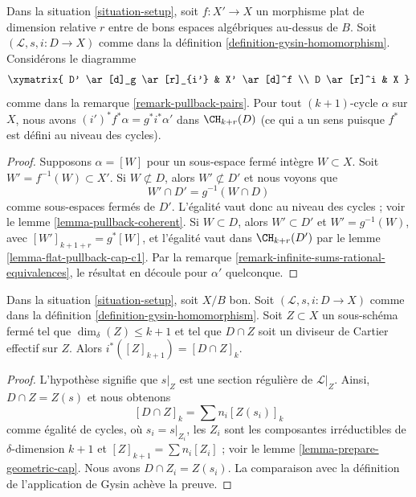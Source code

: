 \begin{lemma}
\label{lemma-gysin-flat-pullback}
Dans la situation \ref{situation-setup}, soit $f : X' \to X$ un morphisme plat
de dimension relative $r$ entre de bons espaces algébriques au-dessus de $B$. Soit
$(\mathcal{L}, s, i : D \to X)$ comme dans la définition
\ref{definition-gysin-homomorphism}. Considérons le diagramme
$$
\xymatrix{
D' \ar[d]_g \ar[r]_{i'} & X' \ar[d]^f \\
D \ar[r]^i & X
}
$$
comme dans la remarque \ref{remark-pullback-pairs}. Pour tout $(k + 1)$-cycle
$\alpha$ sur $X$, nous avons $(i')^*f^*\alpha = g^*i^*\alpha'$ dans $\CH_{k +
r}(D)$ (ce qui a un sens puisque $f^*$ est défini au niveau des cycles).
\end{lemma}

\begin{proof}
Supposons $\alpha = [W]$ pour un sous-espace fermé intègre $W \subset X$.
Soit $W' = f^{-1}(W) \subset X'$. Si $W \not \subset D$, alors $W'
\not \subset D'$ et nous voyons que
$$
W' \cap D' = g^{-1}(W \cap D)
$$
comme sous-espaces fermés de $D'$. L'égalité vaut donc au niveau des cycles ;
voir le lemme \ref{lemma-pullback-coherent}. Si $W
\subset D$, alors $W' \subset D'$ et $W' = g^{-1}(W)$, avec $[W']_{k + 1 + r} =
g^*[W]$, et l'égalité vaut dans $\CH_{k + r}(D')$ par le lemme
\ref{lemma-flat-pullback-cap-c1}. Par la remarque
\ref{remark-infinite-sums-rational-equivalences}, le résultat en découle pour
$\alpha'$ quelconque.
\end{proof}

\begin{lemma}
\label{lemma-easy-gysin}
Dans la situation \ref{situation-setup}, soit $X/B$ bon. Soit
$(\mathcal{L}, s, i : D \to X)$ comme dans la définition
\ref{definition-gysin-homomorphism}. Soit $Z \subset X$ un sous-schéma fermé
tel que $\dim_\delta(Z) \leq k + 1$ et tel que $D \cap Z$ soit un diviseur de
Cartier effectif sur $Z$. Alors $i^*([Z]_{k + 1}) = [D \cap Z]_k$.
\end{lemma}

\begin{proof}
L'hypothèse signifie que $s|_Z$ est une section régulière de $\mathcal{L}|_Z$.
Ainsi, $D \cap Z = Z(s)$ et nous obtenons
$$
[D \cap Z]_k = \sum n_i [Z(s_i)]_k
$$
comme égalité de cycles, où $s_i = s|_{Z_i}$, les $Z_i$ sont les composantes irréductibles
de $\delta$-dimension $k + 1$ et $[Z]_{k + 1} = \sum n_i[Z_i]$ ; voir le lemme
\ref{lemma-prepare-geometric-cap}. Nous avons $D \cap Z_i = Z(s_i)$. La
comparaison avec la définition de l'application de Gysin achève la preuve.
\end{proof}













